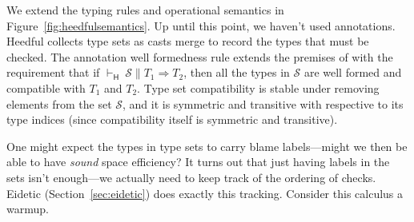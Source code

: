 \documentclass[9pt]{extarticle}
\newcommand{\ottnt}[1]{\mathit{#1}}
\begin{document}
{We extend the typing rules and operational semantics in
Figure~\ref{fig:heedfulsemantics}.
Up until this point, we haven't used annotations. Heedful \lambdah
collects type sets as casts merge to record the types that must be
checked.
The  annotation well formedness rule extends the premises
of  with the requirement that if $ \mathord{  \vdash _{  \mathsf{H}  } }~ \mathcal{S}   \mathrel{\parallel}   \ottnt{T_{{\mathrm{1}}}}  \Rightarrow  \ottnt{T_{{\mathrm{2}}}} $,
then all the types in $\mathcal{S}$ are well formed and compatible with
$\ottnt{T_{{\mathrm{1}}}}$ and $\ottnt{T_{{\mathrm{2}}}}$.
Type set compatibility is stable under removing elements from the set
$\mathcal{S}$, and it is symmetric and transitive with respective to its
type indices (since compatibility itself is symmetric and transitive).

One might expect the types in type sets to carry blame labels---might
we then be able to have \textit{sound} space efficiency? It turns out
that just having labels in the sets isn't enough---we actually need to
keep track of the ordering of checks. Eidetic \lambdah
(Section~\ref{sec:eidetic}) does exactly this tracking. Consider this calculus a warmup.


}
\end{document}
